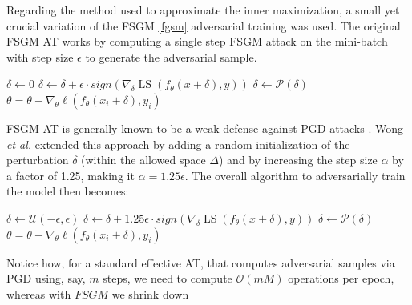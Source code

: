 \documentclass[LaM,binding=0.6cm]{./packages/sapthesis/sapthesis}
\begin{document}
        Regarding the method used to approximate the inner maximization, a small yet crucial variation of the FSGM \ref{fgsm} adversarial training was used.
        The original FSGM AT works by computing a single step FSGM attack on the mini-batch with step size $\epsilon$ to generate the adversarial sample.
        \newpage
        \begin{algorithmic}[0]
             
             
            \State $\delta \gets 0$
            \State $\delta \gets \delta + \epsilon \cdot sign(\nabla_{\delta} \operatorname{LS}\left(f_{\theta}(x+\delta), y\right))$  
            \State $\delta \gets \mathcal{P}(\delta) $
            \State $\theta=\theta-\nabla_{\theta} \ell\left(f_{\theta}\left(x_{i}+\delta\right), y_{i}\right)$ 
            \EndFor
            \EndFor
            \EndProcedure
        \end{algorithmic}
        FSGM AT is generally known to be a weak defense against PGD attacks \cite{physical_adv}.
        Wong \textit{et al.} extended this approach by adding a random initialization of the perturbation 
        $\delta$ (within the allowed space $\Delta$) and by increasing the step size $\alpha$ by a factor of 1.25, making it $\alpha = 1.25 \epsilon$.
        The overall algorithm to adversarially train the model then becomes:
        \begin{algorithmic}[h]
             
             
            \State $\delta \gets \mathcal{U}(-\epsilon, \epsilon) $ 
            \State $\delta \gets \delta + 1.25\epsilon \cdot sign(\nabla_{\delta} \operatorname{LS}\left(f_{\theta}(x+\delta), y\right))$  
            \State $\delta \gets \mathcal{P}(\delta) $
            \State $\theta=\theta-\nabla_{\theta} \ell\left(f_{\theta}\left(x_{i}+\delta\right), y_{i}\right)$ 
            \EndFor
            \EndFor
            \EndProcedure
        \end{algorithmic}
        Notice how, for a standard effective AT, that computes adversarial samples via PGD using, say, $m$
        steps, we need to compute $\mathcal{O}\left(mM\right)$ operations per epoch, whereas with $FSGM$ we shrink down 
\end{document}
